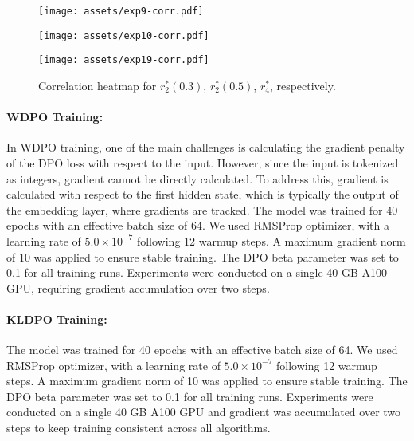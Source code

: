 \begin{figure}[!ht]
    \centering
    \begin{minipage}{0.32\textwidth}
        \centering
        \texttt{[image: assets/exp9-corr.pdf]}
        \label{fig:exp9-corr}
    \end{minipage}
    \hfill
    \begin{minipage}{0.32\textwidth}
        \centering
        \texttt{[image: assets/exp10-corr.pdf]}
        \label{fig:exp10-corr}
    \end{minipage}
    \hfill
    \begin{minipage}{0.32\textwidth}
        \centering
        \texttt{[image: assets/exp19-corr.pdf]}
        \label{fig:exp19-corr}
    \end{minipage}
    \caption{Correlation heatmap for $r^*_2(0.3)$, $r^*_2(0.5)$, $r^*_4$, respectively.}
    \label{fig:corr-fig-2}
\end{figure}

\paragraph{WDPO Training:} In WDPO training, one of the main challenges is calculating the gradient penalty of the DPO loss with respect to the input. However, since the input is tokenized as integers, gradient cannot be directly calculated. To address this, gradient is calculated with respect to the first hidden state, which is typically the output of the embedding layer, where gradients are tracked. The model was trained for 40 epochs with an effective batch size of 64. We used RMSProp optimizer, with a learning rate of $5.0 \times 10^{-7} $ following 12 warmup steps. A maximum gradient norm of 10 was applied to ensure stable training. The DPO beta parameter was set to 0.1 for all training runs. Experiments were conducted on a single 40 GB A100 GPU, requiring gradient accumulation over two steps.


\paragraph{KLDPO Training:} The model was trained for 40 epochs with an effective batch size of 64. We used RMSProp optimizer, with a learning rate of $5.0 \times 10^{-7} $ following 12 warmup steps. A maximum gradient norm of 10 was applied to ensure stable training. The DPO beta parameter was set to 0.1 for all training runs. Experiments were conducted on a single 40 GB A100 GPU and gradient was accumulated over two steps to keep training consistent across all algorithms.

